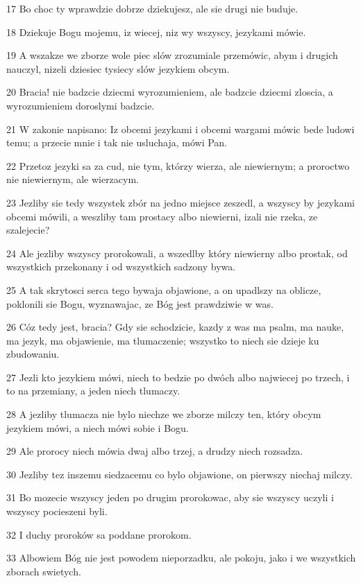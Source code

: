 \par 17 Bo choc ty wprawdzie dobrze dziekujesz, ale sie drugi nie buduje.
\par 18 Dziekuje Bogu mojemu, iz wiecej, niz wy wszyscy, jezykami mówie.
\par 19 A wszakze we zborze wole piec slów zrozumiale przemówic, abym i drugich nauczyl, nizeli dziesiec tysiecy slów jezykiem obcym.
\par 20 Bracia! nie badzcie dziecmi wyrozumieniem, ale badzcie dziecmi zloscia, a wyrozumieniem doroslymi badzcie.
\par 21 W zakonie napisano: Iz obcemi jezykami i obcemi wargami mówic bede ludowi temu; a przecie mnie i tak nie usluchaja, mówi Pan.
\par 22 Przetoz jezyki sa za cud, nie tym, którzy wierza, ale niewiernym; a proroctwo nie niewiernym, ale wierzacym.
\par 23 Jezliby sie tedy wszystek zbór na jedno miejsce zeszedl, a wszyscy by jezykami obcemi mówili, a weszliby tam prostacy albo niewierni, izali nie rzeka, ze szalejecie?
\par 24 Ale jezliby wszyscy prorokowali, a wszedlby który niewierny albo prostak, od wszystkich przekonany i od wszystkich sadzony bywa.
\par 25 A tak skrytosci serca tego bywaja objawione, a on upadlszy na oblicze, poklonili sie Bogu, wyznawajac, ze Bóg jest prawdziwie w was.
\par 26 Cóz tedy jest, bracia? Gdy sie schodzicie, kazdy z was ma psalm, ma nauke, ma jezyk, ma objawienie, ma tlumaczenie; wszystko to niech sie dzieje ku zbudowaniu.
\par 27 Jezli kto jezykiem mówi, niech to bedzie po dwóch albo najwiecej po trzech, i to na przemiany, a jeden niech tlumaczy.
\par 28 A jezliby tlumacza nie bylo niechze we zborze milczy ten, który obcym jezykiem mówi, a niech mówi sobie i Bogu.
\par 29 Ale prorocy niech mówia dwaj albo trzej, a drudzy niech rozsadza.
\par 30 Jezliby tez inszemu siedzacemu co bylo objawione, on pierwszy niechaj milczy.
\par 31 Bo mozecie wszyscy jeden po drugim prorokowac, aby sie wszyscy uczyli i wszyscy pocieszeni byli.
\par 32 I duchy proroków sa poddane prorokom.
\par 33 Albowiem Bóg nie jest powodem nieporzadku, ale pokoju, jako i we wszystkich zborach swietych.
